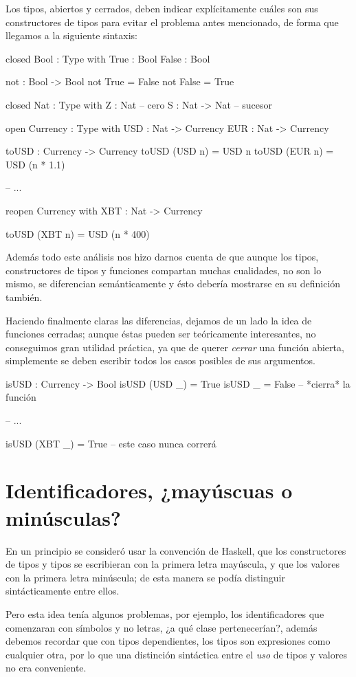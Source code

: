 \begin{designfr}
Los tipos, abiertos y cerrados, deben indicar explícitamente cuáles son sus constructores de tipos para evitar el problema antes mencionado, de forma que llegamos a la siguiente sintaxis:

\begin{anglercode}
closed Bool : Type with
    True : Bool
    False : Bool

not : Bool -> Bool
not True = False
not False = True

closed Nat : Type with
    Z : Nat             -- cero
    S : Nat -> Nat      -- sucesor

open Currency : Type with
    USD : Nat -> Currency
    EUR : Nat -> Currency

toUSD : Currency -> Currency
toUSD (USD n) = USD n
toUSD (EUR n) = USD (n * 1.1)

-- ...

reopen Currency with
    XBT : Nat -> Currency

toUSD (XBT n) = USD (n * 400)
\end{anglercode}

Además todo este análisis nos hizo darnos cuenta de que aunque los tipos, constructores de tipos y funciones compartan muchas cualidades, no son lo mismo, se diferencian semánticamente y ésto debería mostrarse en su definición también.

Haciendo finalmente claras las diferencias, dejamos de un lado la idea de funciones cerradas; aunque éstas pueden ser teóricamente interesantes, no conseguimos gran utilidad práctica, ya que de querer \textit{cerrar} una función abierta, simplemente se deben escribir todos los casos posibles de sus argumentos.

\begin{anglercode}
isUSD : Currency -> Bool
isUSD (USD _) = True
isUSD _ = False         -- *cierra* la función

-- ...

isUSD (XBT _) = True    -- este caso nunca correrá
\end{anglercode}
\end{designfr}

\section{Identificadores, ¿mayúscuas o minúsculas?}

\begin{designfr}
En un principio se consideró usar la convención de Haskell, que los constructores de tipos y tipos se escribieran con la primera letra mayúscula, y que los valores con la primera letra minúscula; de esta manera se podía distinguir sintácticamente entre ellos.

Pero esta idea tenía algunos problemas, por ejemplo, los identificadores que comenzaran con símbolos y no letras, ¿a qué clase pertenecerían?, además debemos recordar que con tipos dependientes, los tipos son expresiones como cualquier otra, por lo que una distinción sintáctica entre el \emph{uso} de tipos y valores no era conveniente.
\end{designfr}

